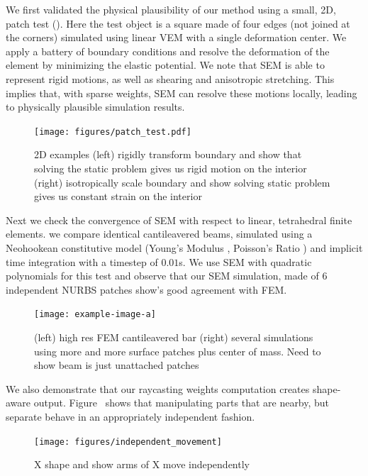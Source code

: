 

We first validated the physical plausibility of our method using a small, 2D, patch test (). 
Here the test object is a square made of four edges (not joined at the corners) simulated using linear VEM with a single deformation center.
We apply a battery of boundary conditions and resolve the deformation of the element by minimizing the elastic potential.
We note that SEM is able to represent rigid motions, as well as shearing and anisotropic stretching. 
This implies that, with sparse weights, SEM can resolve these motions locally, leading to physically plausible simulation results.

\begin{figure}[h]
  \texttt{[image: figures/patch\_test.pdf]}
  \caption{2D examples (left) rigidly transform boundary and show that solving the static problem gives us rigid motion on the interior (right) isotropically scale boundary and show solving static problem gives us constant strain on the interior}
  \label{fig:patchtest}
\end{figure}

Next we check the convergence of SEM with respect to linear, tetrahedral finite elements.  we compare identical cantileavered beams, simulated using 
a Neohookean constitutive model (Young's Modulus , Poisson's Ratio ) and implicit time integration with a timestep of $0.01$s. 
We use SEM with quadratic polynomials for this test and observe that our SEM simulation, made of 6 independent NURBS patches show's good agreement with FEM.
\begin{figure}[h]
  \texttt{[image: example-image-a]}
  \caption{(left) high res FEM cantileavered bar (right) several simulations using more and more surface patches plus center of mass. Need to show beam is just  unattached patches}
  \label{fig:convergence}
\end{figure}

We also demonstrate that our raycasting weights computation creates shape-aware output. Figure~ shows that manipulating
parts that are nearby, but separate  behave in an appropriately independent fashion. 
\begin{figure}[h]
  \texttt{[image: figures/independent\_movement]}
  \caption{X shape and show arms of X move independently}
  \label{fig:independence}
\end{figure}

